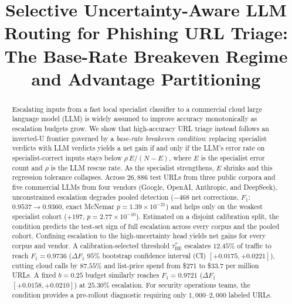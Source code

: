 \documentclass[conference,a4paper]{IEEEtran}
\newcommand{\rrescue}{\rho}
\begin{document}
\title{Selective Uncertainty-Aware LLM Routing for Phishing URL
Triage: The Base-Rate Breakeven Regime and Advantage Partitioning}

\author{
}

\maketitle

\begin{abstract}
Escalating inputs from a fast local specialist classifier to a commercial cloud
large language model (LLM) is widely assumed to improve accuracy monotonically as
escalation budgets grow. We show that high-accuracy URL triage instead follows an
inverted-U frontier governed by a \emph{base-rate breakeven condition}: replacing
specialist verdicts with LLM verdicts yields a net gain if and only if the LLM's
error rate on specialist-correct inputs stays below $\rrescue\,E/(N-E)$, where
$E$ is the specialist error count and $\rrescue$ is the LLM rescue rate. As the
specialist strengthens, $E$ shrinks and this regression tolerance collapses. Across
$26{,}886$ test URLs from three public corpora and five commercial LLMs from four
vendors (Google, OpenAI, Anthropic, and DeepSeek), unconstrained escalation degrades
pooled detection ($-468$ net corrections, $F_1$: $0.9537\to0.9360$, exact McNemar
$p=1.39\times10^{-21}$) and helps only on the weakest specialist cohort ($+197$,
$p=2.77\times10^{-10}$). Estimated on a disjoint calibration split, the condition
predicts the test-set sign of full escalation across every corpus and the pooled
cohort. Confining escalation to the high-uncertainty head yields net gains for
every corpus and vendor. A calibration-selected threshold $\tau^{\ast}_{\mathrm{BE}}$
escalates $12.45\%$ of traffic to reach $F_1=0.9736$ ($\Delta F_1$ $95\%$ bootstrap confidence
interval (CI) $[+0.0175,+0.0221]$), cutting cloud calls by $87.55\%$ and list-price
spend from \$271 to \$33.7 per million URLs. A fixed $b=0.25$ budget similarly
reaches $F_1=0.9721$ ($\Delta F_1$ $[+0.0158,+0.0210]$) at $25.30\%$ escalation. For security
operations teams, the condition provides a pre-rollout diagnostic requiring only
$1{,}000$--$2{,}000$ labeled URLs.
\end{abstract}
\end{document}
